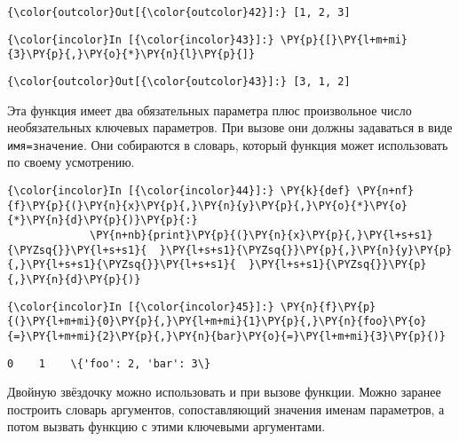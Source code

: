             \begin{Verbatim}[commandchars=\\\{\}]
{\color{outcolor}Out[{\color{outcolor}42}]:} [1, 2, 3]
\end{Verbatim}
        
    \begin{Verbatim}[commandchars=\\\{\}]
{\color{incolor}In [{\color{incolor}43}]:} \PY{p}{[}\PY{l+m+mi}{3}\PY{p}{,}\PY{o}{*}\PY{n}{l}\PY{p}{]}
\end{Verbatim}

            \begin{Verbatim}[commandchars=\\\{\}]
{\color{outcolor}Out[{\color{outcolor}43}]:} [3, 1, 2]
\end{Verbatim}
        
    Эта функция имеет два обязательных параметра плюс произвольное число
необязательных ключевых параметров. При вызове они должны задаваться в
виде \texttt{имя=значение}. Они собираются в словарь, который функция
может использовать по своему усмотрению.

    \begin{Verbatim}[commandchars=\\\{\}]
{\color{incolor}In [{\color{incolor}44}]:} \PY{k}{def} \PY{n+nf}{f}\PY{p}{(}\PY{n}{x}\PY{p}{,}\PY{n}{y}\PY{p}{,}\PY{o}{*}\PY{o}{*}\PY{n}{d}\PY{p}{)}\PY{p}{:}
             \PY{n+nb}{print}\PY{p}{(}\PY{n}{x}\PY{p}{,}\PY{l+s+s1}{\PYZsq{}}\PY{l+s+s1}{  }\PY{l+s+s1}{\PYZsq{}}\PY{p}{,}\PY{n}{y}\PY{p}{,}\PY{l+s+s1}{\PYZsq{}}\PY{l+s+s1}{  }\PY{l+s+s1}{\PYZsq{}}\PY{p}{,}\PY{n}{d}\PY{p}{)}
\end{Verbatim}

    \begin{Verbatim}[commandchars=\\\{\}]
{\color{incolor}In [{\color{incolor}45}]:} \PY{n}{f}\PY{p}{(}\PY{l+m+mi}{0}\PY{p}{,}\PY{l+m+mi}{1}\PY{p}{,}\PY{n}{foo}\PY{o}{=}\PY{l+m+mi}{2}\PY{p}{,}\PY{n}{bar}\PY{o}{=}\PY{l+m+mi}{3}\PY{p}{)}
\end{Verbatim}

    \begin{Verbatim}[commandchars=\\\{\}]
0    1    \{'foo': 2, 'bar': 3\}

    \end{Verbatim}

    Двойную звёздочку можно использовать и при вызове функции. Можно заранее
построить словарь аргументов, сопоставляющий значения именам параметров,
а потом вызвать функцию с этими ключевыми аргументами.

